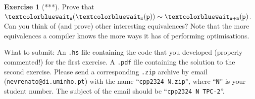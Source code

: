 \documentclass[a4paper, 11pt]{article}
\theoremstyle{definition}
\newtheorem{exercise}{Exercise}
\theoremstyle{sub}
\begin{document}
\begin{exercise}[***]
        Prove that $\mathtt{\blue{wait_n}(\blue{wait_m}(p))} \sim
        \mathtt{\blue{wait_{n + m}}(p)}$. Can you think of (and prove) other
        interesting equivalences? Note that the more equivalences a compiler
        knows the more ways it has of performing optimisations.
\end{exercise}

\begin{mdframed}
  What to submit: An \texttt{.hs} file containing the code that you developed
  (properly commented!) for the first exercise. A \texttt{.pdf} file containing
  the solution to the second exercise. Please send a corresponding
  \texttt{.zip} archive by email (\texttt{nevrenato@di.uminho.pt}) with the
  name ``\texttt{cpp2324-N.zip}'', where ``\texttt{N}'' is your student number.
  The subject of the email should be ``\texttt{cpp2324 N TPC-2}''.
\end{mdframed}





\end{document}
